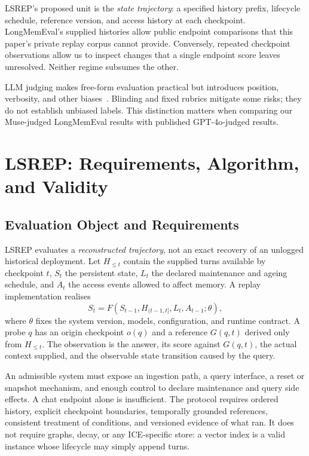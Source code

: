 \documentclass[11pt,a4paper]{article}
\begin{document}
LSREP's proposed unit is the \emph{state trajectory}: a specified history prefix, lifecycle schedule, reference version, and access history at each checkpoint. LongMemEval's supplied histories allow public endpoint comparisons that this paper's private replay corpus cannot provide. Conversely, repeated checkpoint observations allow us to inspect changes that a single endpoint score leaves unresolved. Neither regime subsumes the other.

LLM judging makes free-form evaluation practical but introduces position, verbosity, and other biases~\citep{zheng2023judging,liu2023geval,wang2024unfair}. Blinding and fixed rubrics mitigate some risks; they do not establish unbiased labels. This distinction matters when comparing our Muse-judged LongMemEval results with published GPT-4o-judged results.

\section{LSREP: Requirements, Algorithm, and Validity}
\label{sec:exp-design}\label{sec:lsrep}
\subsection{Evaluation Object and Requirements}
LSREP evaluates a \emph{reconstructed trajectory}, not an exact recovery of an unlogged historical deployment. Let $H_{\leq t}$ contain the supplied turns available by checkpoint $t$, $S_t$ the persistent state, $L_t$ the declared maintenance and ageing schedule, and $A_t$ the access events allowed to affect memory. A replay implementation realises
\[
S_t = F(S_{t-1}, H_{(t-1,t]}, L_t, A_{t-1};\theta),
\]
where $\theta$ fixes the system version, models, configuration, and runtime contract. A probe $q$ has an origin checkpoint $o(q)$ and a reference $G(q,t)$ derived only from $H_{\leq t}$. The observation is the answer, its score against $G(q,t)$, the actual context supplied, and the observable state transition caused by the query.

An admissible system must expose an ingestion path, a query interface, a reset or snapshot mechanism, and enough control to declare maintenance and query side effects. A chat endpoint alone is insufficient. The protocol requires ordered history, explicit checkpoint boundaries, temporally grounded references, consistent treatment of conditions, and versioned evidence of what ran. It does not require graphs, decay, or any ICE-specific store: a vector index is a valid instance whose lifecycle may simply append turns.
\end{document}
